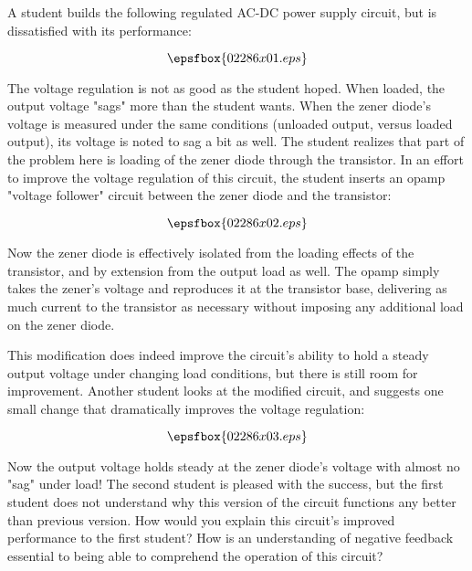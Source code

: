

A student builds the following regulated AC-DC power supply circuit, but is dissatisfied with its performance:

$$\epsfbox{02286x01.eps}$$

The voltage regulation is not as good as the student hoped.  When loaded, the output voltage "sags" more than the student wants.  When the zener diode's voltage is measured under the same conditions (unloaded output, versus loaded output), its voltage is noted to sag a bit as well.  The student realizes that part of the problem here is loading of the zener diode through the transistor.  In an effort to improve the voltage regulation of this circuit, the student inserts an opamp "voltage follower" circuit between the zener diode and the transistor:

$$\epsfbox{02286x02.eps}$$

Now the zener diode is effectively isolated from the loading effects of the transistor, and by extension from the output load as well.  The opamp simply takes the zener's voltage and reproduces it at the transistor base, delivering as much current to the transistor as necessary without imposing any additional load on the zener diode.  

\goodbreak

This modification does indeed improve the circuit's ability to hold a steady output voltage under changing load conditions, but there is still room for improvement.  Another student looks at the modified circuit, and suggests one small change that dramatically improves the voltage regulation:

$$\epsfbox{02286x03.eps}$$

Now the output voltage holds steady at the zener diode's voltage with almost no "sag" under load!  The second student is pleased with the success, but the first student does not understand why this version of the circuit functions any better than previous version.  How would you explain this circuit's improved performance to the first student?  How is an understanding of negative feedback essential to being able to comprehend the operation of this circuit?






